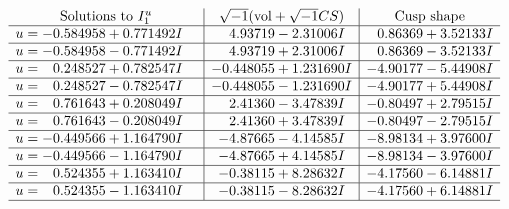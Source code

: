 \documentclass[1p]{elsarticle_modified}
\theoremstyle{definition}
\newcommand{\I}{\sqrt{-1}}
\begin{document}
$$\begin{array}{c|c|c}  
\text{Solutions to }I^u_{1}& \I (\text{vol} + \sqrt{-1}CS) & \text{Cusp shape}\\
 \hline 
\begin{aligned}
u &= -0.584958 + 0.771492 I\end{aligned}
 & \phantom{-}4.93719 - 2.31006 I & \phantom{-}0.86369 + 3.52133 I \\ \hline\begin{aligned}
u &= -0.584958 - 0.771492 I\end{aligned}
 & \phantom{-}4.93719 + 2.31006 I & \phantom{-}0.86369 - 3.52133 I \\ \hline\begin{aligned}
u &= \phantom{-}0.248527 + 0.782547 I\end{aligned}
 & -0.448055 + 1.231690 I & -4.90177 - 5.44908 I \\ \hline\begin{aligned}
u &= \phantom{-}0.248527 - 0.782547 I\end{aligned}
 & -0.448055 - 1.231690 I & -4.90177 + 5.44908 I \\ \hline\begin{aligned}
u &= \phantom{-}0.761643 + 0.208049 I\end{aligned}
 & \phantom{-}2.41360 - 3.47839 I & -0.80497 + 2.79515 I \\ \hline\begin{aligned}
u &= \phantom{-}0.761643 - 0.208049 I\end{aligned}
 & \phantom{-}2.41360 + 3.47839 I & -0.80497 - 2.79515 I \\ \hline\begin{aligned}
u &= -0.449566 + 1.164790 I\end{aligned}
 & -4.87665 - 4.14585 I & -8.98134 + 3.97600 I \\ \hline\begin{aligned}
u &= -0.449566 - 1.164790 I\end{aligned}
 & -4.87665 + 4.14585 I & -8.98134 - 3.97600 I \\ \hline\begin{aligned}
u &= \phantom{-}0.524355 + 1.163410 I\end{aligned}
 & -0.38115 + 8.28632 I & -4.17560 - 6.14881 I \\ \hline\begin{aligned}
u &= \phantom{-}0.524355 - 1.163410 I\end{aligned}
 & -0.38115 - 8.28632 I & -4.17560 + 6.14881 I\\
 \hline 
 \end{array}$$\newpage\newpage\renewcommand{\arraystretch}{1}
\end{document}
